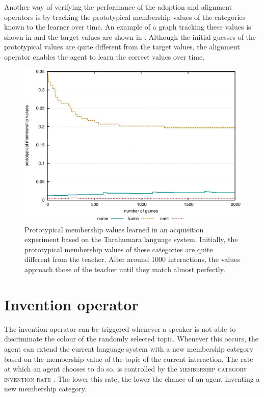 Another way of verifying the performance of the adoption and alignment
operators is by tracking the prototypical membership values of the
categories known to the learner over time. An example of a graph tracking these values
is shown in  and the target values
are shown in . Although the
initial guesses of the prototypical values are quite different from
the target values, the alignment operator enables the agent to learn
the correct values over time.

\begin{figure}[htpb]
  \begin{center}
    \includegraphics[width=.8\textwidth]{./graded-membership/figures/strict-acquisition-values.pdf}
    \caption[Prototypical membership values learned in an acquisition
    experiment]{Prototypical membership values learned in an
      acquisition experiment based on the Tarahumara language
      system. Initially, the prototypical membership values of these
      categories are quite different from the teacher. After around
      1000 interactions, the values approach those of the teacher
      until they match almost perfectly.}
    \label{f:gm-acquisition-values}
  \end{center}
\end{figure}

\section{Invention operator}

The invention operator 
can be triggered whenever a
speaker is not able to discriminate the colour of the randomly selected
topic. Whenever this occurs, the agent can extend the current language
system with a new membership category based on the membership value
of the topic of the current interaction. The rate at which an agent
chooses to do so, is controlled by the \textsc{membership category
  invention rate}
.
The lower this rate, the lower the chance of an agent inventing a new
membership category.

